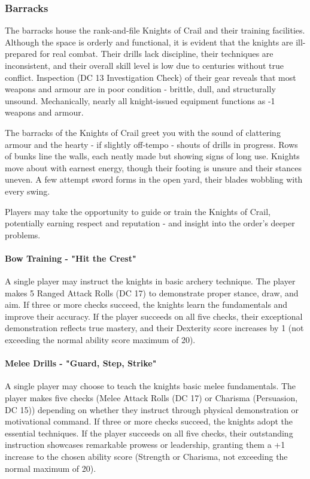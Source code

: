 \subsubsection*{ Barracks}
{\entryfont The barracks house the rank-and-file Knights of Crail and their training facilities. Although the space is orderly and functional, it is evident that the knights are ill-prepared for real combat. Their drills lack discipline, their techniques are inconsistent, and their overall skill level is low due to centuries without true conflict. Inspection (DC 13 Investigation Check) of their gear reveals that most weapons and armour are in poor condition - brittle, dull, and structurally unsound. Mechanically, nearly all knight-issued equipment functions as -1 weapons and armour.}
\begin{DndReadAloud}
	The barracks of the Knights of Crail greet you with the sound of clattering armour and the hearty - if slightly off-tempo - shouts of drills in progress. Rows of bunks line the walls, each neatly made but showing signs of long use. Knights move about with earnest energy, though their footing is unsure and their stances uneven. A few attempt sword forms in the open yard, their blades wobbling with every swing.
\end{DndReadAloud}
\vfill\eject
{\noindent\entryfont Players may take the opportunity to guide or train the Knights of Crail, potentially earning respect and reputation - and insight into the order's deeper problems.}
\paragraph*{Bow Training - "Hit the Crest"}
{\entryfont A single player may instruct the knights in basic archery technique. The player makes 5 Ranged Attack Rolls (DC 17) to demonstrate proper stance, draw, and aim. If three or more checks succeed, the knights learn the fundamentals and improve their accuracy. If the player succeeds on all five checks, their exceptional demonstration reflects true mastery, and their Dexterity score increases by 1 (not exceeding the normal ability score maximum of 20).}
\paragraph*{Melee Drills - "Guard, Step, Strike"}
{\entryfont A single player may choose to teach the knights basic melee fundamentals. The player makes five checks (Melee Attack Rolls (DC 17) or Charisma (Persuasion, DC 15)) depending on whether they instruct through physical demonstration or motivational command. If three or more checks succeed, the knights adopt the essential techniques. If the player succeeds on all five checks, their outstanding instruction showcases remarkable prowess or leadership, granting them a +1 increase to the chosen ability score (Strength or Charisma, not exceeding the normal maximum of 20).}
